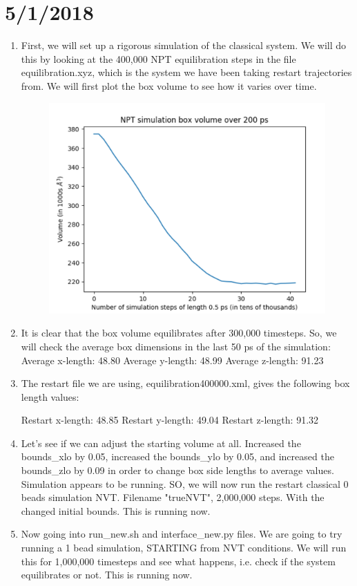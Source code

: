 \documentclass[12pt,reqno]{amsart}
\numberwithin{equation}{section}
\begin{document}
\section{5/1/2018}

\begin{enumerate}
\item First, we will set up a rigorous simulation of the classical system.  We will do this by looking at the 400,000 NPT equilibration steps in the file equilibration.xyz, which is the system we have been taking restart trajectories from.  We will first plot the box volume to see how it varies over time.  

\begin{figure}[H]
\centering
\includegraphics[scale=0.4]{NPTvolumes}
\end{figure}

\item It is clear that the box volume equilibrates after 300,000 timesteps.  So, we will check the average box dimensions in the last 50 ps of the simulation:  
\subitem Average x-length: 48.80
\subitem Average y-length: 48.99
\subitem Average z-length: 91.23

\item The restart file we are using, equilibration400000.xml, gives the following box length values:

\subitem Restart x-length: 48.85
\subitem Restart y-length: 49.04
\subitem Restart z-length: 91.32

\item Let's see if we can adjust the starting volume at all.  Increased the bounds\_xlo by 0.05, increased the bounds\_ylo by 0.05, and increased the bounds\_zlo by 0.09 in order to change box side lengths to average values.  Simulation appears to be running.  SO, we will now run the restart classical 0 beads simulation NVT.  Filename "trueNVT", 2,000,000 steps.  With the changed initial bounds.  This is running now.
\item Now going into run\_new.sh and interface\_new.py files.  We are going to try running a 1 bead simulation, STARTING from NVT conditions.  We will run this for 1,000,000 timesteps and see what happens, i.e. check if the system equilibrates or not.  This is running now.

\end{enumerate}
\end{document}
